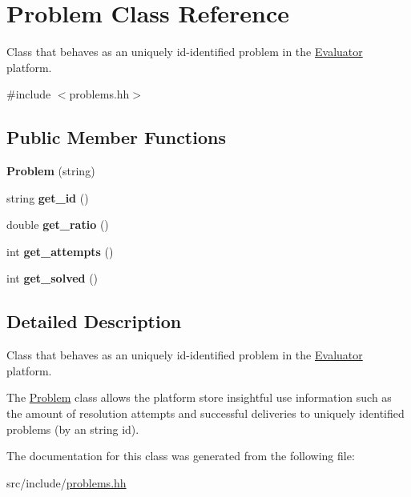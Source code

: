 \hypertarget{classProblem}{}\section{Problem Class Reference}
\label{classProblem}


Class that behaves as an uniquely id-\/identified problem in the \hyperlink{classEvaluator}{Evaluator} platform.  




{\ttfamily \#include $<$problems.\+hh$>$}

\subsection*{Public Member Functions}
\begin{DoxyCompactItemize}
\item 
\mbox{\label{classProblem_a268b32d34a1da07721583b92efea813e}} 
{\bfseries Problem} (string)
\item 
\mbox{\label{classProblem_a7658719f5220a529606d8d83eb44f721}} 
string {\bfseries get\+\_\+id} ()
\item 
\mbox{\label{classProblem_a65162b89457b09ef5cc426281c3557f1}} 
double {\bfseries get\+\_\+ratio} ()
\item 
\mbox{\label{classProblem_a12db898d1d6b91126ad417f39895a8f8}} 
int {\bfseries get\+\_\+attempts} ()
\item 
\mbox{\label{classProblem_a74f25aafeba797025a5008e89b2a515c}} 
int {\bfseries get\+\_\+solved} ()
\end{DoxyCompactItemize}


\subsection{Detailed Description}
Class that behaves as an uniquely id-\/identified problem in the \hyperlink{classEvaluator}{Evaluator} platform. 

The \hyperlink{classProblem}{Problem} class allows the platform store insightful use information such as the amount of resolution attempts and successful deliveries to uniquely identified problems (by an string id). 

The documentation for this class was generated from the following file\+:\begin{DoxyCompactItemize}
\item 
src/include/\hyperlink{problems_8hh}{problems.\+hh}\end{DoxyCompactItemize}
